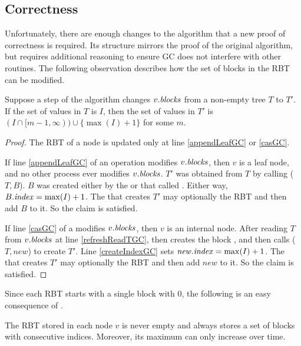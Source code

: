
\subsection{Correctness}
Unfortunately, there are enough changes to the algorithm that a new proof of correctness
is required.  Its structure mirrors the proof of the original algorithm, but requires additional
reasoning to ensure GC does not interfere with other routines.
The following observation describes
how the set of blocks in the RBT can be modified.

\begin{lemma}\label{RBTupdates}
Suppose a step of the algorithm changes $v.\mbox{\textit{blocks}}$ from a non-empty tree $T$ to $T'$.
If the set of  values  in $T$ is $I$, then the set of  values in $T'$ is 
$(I \cap [m-1,\infty))\cup \{\max(I) + 1\}$ for some $m$.
\end{lemma}
\begin{proof}
The RBT of a node is updated only at line \ref{appendLeafGC} or \ref{casGC}.

If line \ref{appendLeafGC} of an  operation modifies $v.\mbox{\textit{blocks}}$,
then $v$ is a leaf node, and no other process ever modifies $v.\mbox{\textit{blocks}}$.
$T'$ was obtained from $T$ by calling ($T,B$).
$B$ was created either by the  or  that called .
Either way, $B.\mbox{\textit{index}} = \max(I)+1$.
The  that creates $T'$ may optionally  the RBT and then add $B$ to it.
So the claim is satisfied.

If line \ref{casGC} of a  modifies $v.\mbox{\textit{blocks}}$, then $v$ is an internal node.
After reading $T$ from $v.\mbox{\textit{blocks}}$ at line \ref{refreshReadTGC},
then creates the  block ,
and then calls ($T,new$) to create $T'$.
Line \ref{createIndexGC} sets $\mbox{\textnormal{\textit{new}}}.\mbox{\textnormal{\textit{index}}} = \max(I)+1$.
The  that creates $T'$ may optionally  the RBT and then add $new$ to it.
So the claim is satisfied.
\end{proof}

Since each RBT starts with a single block with  0, the following is an easy consequence of .
\begin{corollary}\label{nonEmptyIncreasing}
The RBT stored in each node $v$ is never empty and always stores a set of blocks with consecutive indices.
Moreover, its maximum  can only increase over time.
\end{corollary}

